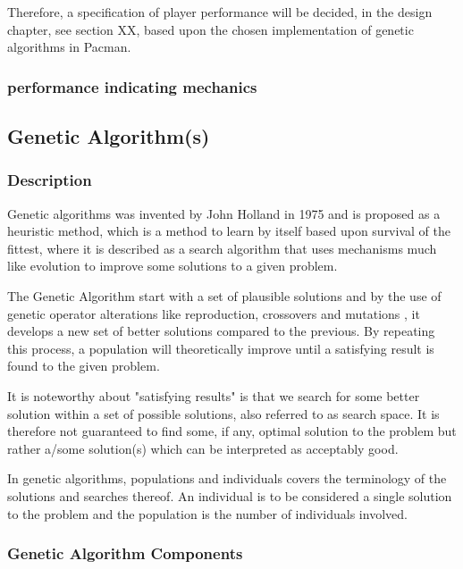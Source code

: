Therefore, a specification of player performance will be decided, in the design chapter, see section XX, based upon the chosen implementation of genetic algorithms in Pacman.

\subsubsection{performance indicating mechanics}



\subsection{Genetic Algorithm(s)}

\subsubsection{Description}
Genetic algorithms was invented by John Holland in 1975 and is proposed as a heuristic method, which is a method to learn by itself based upon survival of the fittest, where it is described as a  search algorithm that uses mechanisms much like evolution to improve some solutions to a given problem. \cite[pp. 20]{Sivanandam2008}

The Genetic Algorithm start with a set of plausible solutions and by the use of genetic operator alterations like reproduction, crossovers and mutations \cite{Baltzer2014}, it develops a new set of better solutions compared to the previous. By repeating this process, a population will theoretically improve until a satisfying result is found to the given problem. \cite{BCS2013}

It is noteworthy about "satisfying results" is that we search for some better solution within a set of possible solutions, also referred to as search space. It is therefore not guaranteed to find some, if any, optimal solution to the problem but rather a/some solution(s) which can be interpreted as acceptably good. \cite[pp. 20/21]{Sivanandam2008}


In genetic algorithms, populations and individuals covers the terminology of the solutions and searches thereof. An individual is to be considered a single solution to the problem and the population is the number of individuals involved. \cite[pp. 39]{Sivanandam2008}



\subsubsection{Genetic Algorithm Components}

